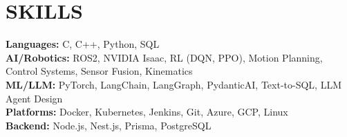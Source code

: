 \documentclass[letterpaper, 9pt]{article}
\begin{document}
\section{SKILLS}
\begin{itemize}[leftmargin=0in, label={}]
    \small{\item{
        \textbf{Languages:} C, C++, Python, SQL \\
        \textbf{AI/Robotics:} ROS2, NVIDIA Isaac, RL (DQN, PPO), Motion Planning, Control Systems, Sensor Fusion, Kinematics \\
        \textbf{ML/LLM:} PyTorch, LangChain, LangGraph, PydanticAI, Text-to-SQL, LLM Agent Design \\
        \textbf{Platforms:} Docker, Kubernetes, Jenkins, Git, Azure, GCP, Linux \\
        \textbf{Backend:} Node.js, Nest.js, Prisma, PostgreSQL
    }}
\end{itemize}
\end{document}
